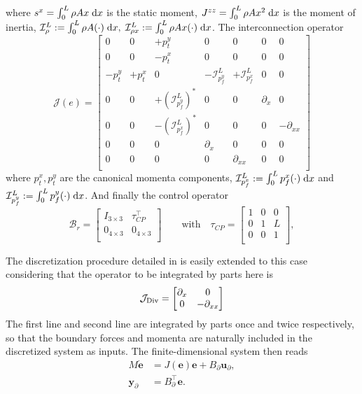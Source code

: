 where  $s^x = \int_{0}^{L} \rho A x \d{x}$ is the static moment, $J^{zz} = \int_{0}^{L} \rho A x^2 \d{x}$ is the moment of inertia, $\mathcal{I}_\rho^L := \int_{0}^L \rho A (\cdot) \d{x}, \; \mathcal{I}_{\rho x}^L := \int_{0}^L \rho A x (\cdot) \d{x}$. The interconnection operator 
\begin{equation}
\label{eq:EB_J}
\mathcal{J}(e) = 
\begin{bmatrix}
0 & 0 & +p_t^y      & 0 & 0 & 0 & 0 \\
0 & 0 & -p_t^x     & 0 & 0 & 0 & 0 \\
-p_t^y & +p_t^x & 0 & -\mathcal{I}_{p_f^y}^{L} & +\mathcal{I}_{p_f^x}^{L} & 0 & 0 \\
0 & 0 & +(\mathcal{I}_{p_f^y}^{L})^* & 0 & 0 & \partial_x & 0  \\
0 & 0 & -(\mathcal{I}_{p_f^x}^{L})^* & 0 & 0 & 0 & -\partial_{xx} \\
0 & 0 & 0 & \partial_{x} & 0 & 0 & 0 \\
0 & 0 & 0 & 0 & \partial_{xx} & 0 & 0 \\
\end{bmatrix}
\end{equation}
where $p_t^x, p_t^y$ are the canonical momenta components, $\mathcal{I}_{p_f^x}^{L} := \int_{0}^{L} p_f^x (\cdot) \d{x}$ and $\mathcal{I}_{p_f^y}^{L} := \int_{0}^{L} p_f^y (\cdot) \d{x}$. And finally the control operator
\begin{equation}
\mathcal{B}_r = \begin{bmatrix}
I_{3\times 3} & \tau_{CP}^\top \\
0_{4\times 3} & 0_{4\times 3} \\
\end{bmatrix} \qquad \text{with} \quad
\tau_{CP} = \begin{bmatrix}
1 & 0 & 0 \\
0 & 1 & L \\
0 & 0 & 1 \\
\end{bmatrix},
\end{equation}

The discretization procedure detailed in  is easily extended to this case considering that the operator to be integrated by parts here is 
\[
\mathcal{J}_{\operatorname*{Div}} = \begin{bmatrix}
\partial_x & 0 \\
0 & -\partial_{xx} \\
\end{bmatrix}
\]
The first line and second line are integrated by parts once and twice respectively, so that the boundary forces and momenta are naturally included in the discretized system as inputs. The finite-dimensional system then reads
\begin{equation}
\begin{aligned}
{M} \dot{\bm{e}} &= J(\bm{e}) \bm{e} + {B}_\partial \bm{u}_\partial, \\
\bm{y}_\partial &= {B}_\partial^\top \bm{e}.
\end{aligned}
\end{equation}

